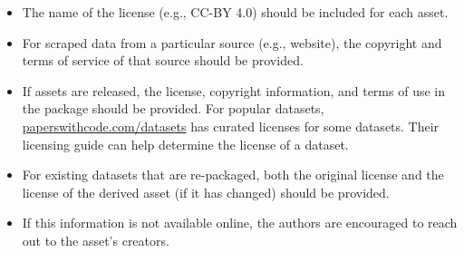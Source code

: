 \begin{enumerate}
\begin{itemize}
        \item The name of the license (e.g., CC-BY 4.0) should be included for each asset.
        \item For scraped data from a particular source (e.g., website), the copyright and terms of service of that source should be provided.
        \item If assets are released, the license, copyright information, and terms of use in the package should be provided. For popular datasets, \url{paperswithcode.com/datasets} has curated licenses for some datasets. Their licensing guide can help determine the license of a dataset.
        \item For existing datasets that are re-packaged, both the original license and the license of the derived asset (if it has changed) should be provided.
        \item If this information is not available online, the authors are encouraged to reach out to the asset's creators.
    \end{itemize}


\end{enumerate}
